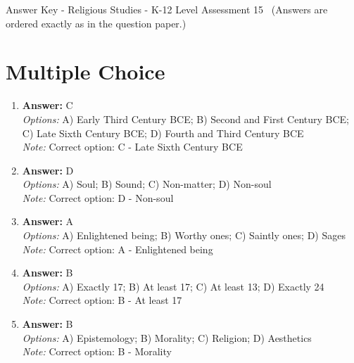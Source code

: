 \documentclass[12pt]{article}
\begin{document}
\begin{center}
Answer Key - Religious Studies - K-12 Level Assessment 15 \
\small (Answers are ordered exactly as in the question paper.)
\end{center}

\section*{Multiple Choice}
\begin{enumerate}[label=\arabic*.]
\item \textbf{Answer:} C
\\ \textit{Options:} A) Early Third Century BCE; B) Second and First Century BCE; C) Late Sixth Century BCE; D) Fourth and Third Century BCE
\\ \textit{Note:} Correct option: C - Late Sixth Century BCE
\item \textbf{Answer:} D
\\ \textit{Options:} A) Soul; B) Sound; C) Non-matter; D) Non-soul
\\ \textit{Note:} Correct option: D - Non-soul
\item \textbf{Answer:} A
\\ \textit{Options:} A) Enlightened being; B) Worthy ones; C) Saintly ones; D) Sages
\\ \textit{Note:} Correct option: A - Enlightened being
\item \textbf{Answer:} B
\\ \textit{Options:} A) Exactly 17; B) At least 17; C) At least 13; D) Exactly 24
\\ \textit{Note:} Correct option: B - At least 17
\item \textbf{Answer:} B
\\ \textit{Options:} A) Epistemology; B) Morality; C) Religion; D) Aesthetics
\\ \textit{Note:} Correct option: B - Morality
\end{enumerate}
\end{document}
